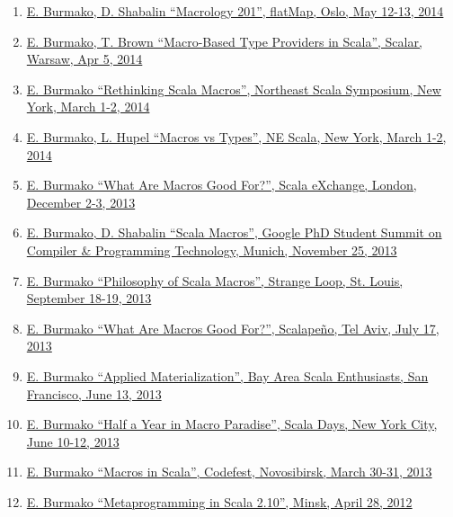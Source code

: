 \documentclass[margin, 10pt]{Stylesheet}
\begin{document}
\begin{resume}
\begin{enumerate}
\item \href{https://github.com/scalamacros/macrology201}{E. Burmako, D. Shabalin ``Macrology 201'', flatMap, Oslo, May 12-13, 2014}
\item \href{https://github.com/travisbrown/type-provider-examples/blob/master/docs/scalar-2014-slides.pdf?raw=true}{E. Burmako, T. Brown ``Macro-Based Type Providers in Scala'', Scalar, Warsaw, Apr 5, 2014}
\item \href{http://scalamacros.org/paperstalks/2014-03-02-RethinkingScalaMacros.pdf}{E. Burmako ``Rethinking Scala Macros'', Northeast Scala Symposium, New York, March 1-2, 2014}
\item \href{http://scalamacros.org/paperstalks/2014-03-01-MacrosVsTypes.pdf}{E. Burmako, L. Hupel ``Macros vs Types'', NE Scala, New York, March 1-2, 2014}
\item \href{http://scalamacros.org/paperstalks/2014-02-04-WhatAreMacrosGoodFor.pdf}{E. Burmako ``What Are Macros Good For?'', Scala eXchange, London, December 2-3, 2013}
\item \href{http://scalamacros.org/paperstalks/2013-11-25-ScalaMacrosPoster.pdf}{E. Burmako, D. Shabalin ``Scala Macros'', Google PhD Student Summit on Compiler \& Programming Technology, Munich, November 25, 2013}
\item \href{http://scalamacros.org/paperstalks/2013-09-19-PhilosophyOfScalaMacros.pdf}{E. Burmako ``Philosophy of Scala Macros'', Strange Loop, St. Louis, September 18-19, 2013}
\item \href{http://scalamacros.org/paperstalks/2014-02-04-WhatAreMacrosGoodFor.pdf}{E. Burmako ``What Are Macros Good For?'', Scalape\~{n}o, Tel Aviv, July 17, 2013}
\item \href{http://scalamacros.org/paperstalks/2013-06-13-AppliedMaterialization.pdf}{E. Burmako ``Applied Materialization'', Bay Area Scala Enthusiasts, San Francisco, June 13, 2013}
\item \href{http://scalamacros.org/paperstalks/2013-06-12-HalfYearInMacroParadise.pdf}{E. Burmako ``Half a Year in Macro Paradise'', Scala Days, New York City, June 10-12, 2013}
\item \href{https://github.com/scalamacros/scalamacros.github.com/raw/master/paperstalks/2013-03-31-ScalaMacros.pdf}{E. Burmako ``Macros in Scala'', Codefest, Novosibirsk, March 30-31, 2013}
\item \href{https://github.com/scalamacros/scalamacros.github.com/raw/master/paperstalks/2012-04-28-MetaprogrammingInScala210.pdf}{E. Burmako ``Metaprogramming in Scala 2.10'', Minsk, April 28, 2012}

\end{enumerate}
\end{resume}
\end{document}
